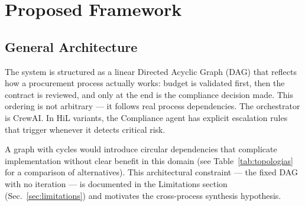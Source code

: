 \documentclass[preprint,12pt,numrefs]{elsarticle}
\begin{document}
\section{Proposed Framework}
\label{sec:framework}

\subsection{General Architecture}

The system is structured as a linear Directed Acyclic Graph (DAG) that
reflects how a procurement process actually works: budget is validated
first, then the contract is reviewed, and only at the end is the
compliance decision made. This ordering is not arbitrary --- it follows
real process dependencies. The orchestrator is CrewAI. In HiL variants,
the Compliance agent has explicit escalation rules that trigger whenever
it detects critical risk.

A graph with cycles would introduce circular dependencies that complicate
implementation without clear benefit in this domain (see
Table~\ref{tab:topologias} for a comparison of alternatives). This
architectural constraint --- the fixed DAG with no iteration --- is
documented in the Limitations section (Sec.~\ref{sec:limitations}) and
motivates the cross-process synthesis hypothesis.

\begin{table}[H]
\centering
\caption{Comparison of orchestration topologies for multi-agent
         procurement systems.}
\label{tab:topologias}
\end{table}
\end{document}
